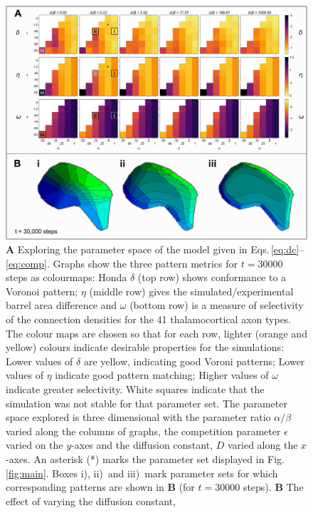 \documentclass[9pt,lineno]{elife}
\newcommand{\MPthreePar}[1]{\textcolor{revbblack}{#1}}
\begin{document}
\begin{figure}
  \begin{fullwidth}
    \includegraphics[width=\linewidth]{./Fig2.png}
    \caption{\MPthreePar{\textbf{A} Exploring the parameter space of the
        model given in Eqs.\,\ref{eq:dc}--\ref{eq:comp}. Graphs show the three
        pattern metrics for $t=30000$ steps as colourmaps: Honda $\delta$ (top
        row) shows conformance to a Voronoi pattern; $\eta$ (middle row) gives
        the simulated/experimental barrel area difference and $\omega$ (bottom
        row) is a measure of selectivity of the connection densities for the
        41 thalamocortical axon types. The colour maps are chosen so that for
        each row, lighter (orange and yellow) colours indicate desirable
        properties for the simulations: Lower values of $\delta$ are yellow,
        indicating good Voroni patterns; Lower values of $\eta$ indicate good
        pattern matching; Higher values of $\omega$ indicate greater
        selectivity. White squares indicate that the simulation was not stable
        for that parameter set.
%
        The parameter space explored is three dimensional with the parameter
        ratio $\alpha/\beta$ varied along the columns of graphs, the
        competition parameter $\epsilon$ varied on the $y$-axes and the
        diffusion constant, $D$ varied along the $x$-axes. An asterisk (*)
        marks the parameter set displayed in Fig.\,\ref{fig:main}. Boxes i),
        ii)~and iii)~mark parameter sets for which corresponding patterns are
        shown in \textbf{B} (for $t=30000$ steps).
%
        \textbf{B} The effect of varying the diffusion constant,
}}
\end{fullwidth}
\end{figure}
\end{document}
